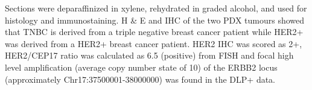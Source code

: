 Sections were deparaffinized in xylene, rehydrated in graded alcohol, and used for histology and immunostaining. 
H \& E and \ac{IHC}  of the two PDX tumours showed that TNBC is  derived from a triple negative breast cancer patient while HER2+ was derived from a HER2+ breast cancer patient. HER2 IHC was scored as 2+, HER2/CEP17 ratio was calculated as 6.5 (positive) \cite{ahn2020her2} from  \ac{FISH}  and focal high level amplification (average copy number state of 10) of the \ac{ERBB2} locus (approximately Chr17:37500001-38000000) was found in the DLP+ data.





